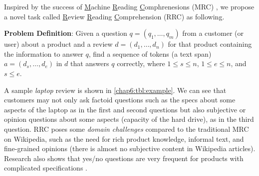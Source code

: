 Inspired by the success of \underline{M}achine \underline{R}eading \underline{C}omphrenesions (MRC) \cite{rajpurkar2016squad,rajpurkar2018know}, we propose a novel task called \underline{R}eview \underline{R}eading \underline{C}omprehension (RRC) as following.

\textbf{Problem Definition}: Given a question $q=(q_1, \dots, q_m)$ from a customer (or user) about a product and a review $d=(d_1, \dots, d_n)$ for that product containing the information to answer $q$, find a sequence of tokens (a text span) $a=(d_s, \dots, d_e)$ in $d$ that answers $q$ correctly, where $1 \le s \le n$, $1\le e \le n$, and $s\le e$.

\begin{table}
    \centering
    \caption{Review reading comprehension}
    \label{chap6:tbl:example}
\end{table}

A sample \emph{laptop} review is shown in \ref{chap6:tbl:example}. 
We can see that customers may not only ask factoid questions such as the specs about some aspects of the laptop as in the first and second questions but also subjective or opinion questions about some aspects (capacity of the hard drive), as in the third question.
RRC poses some \textit{domain challenges} compared to the traditional MRC on Wikipedia, such as the need for rich product knowledge, informal text, and fine-grained opinions (there is almost no subjective content in Wikipedia articles). Research also shows that yes/no questions are very frequent for products with complicated specifications \cite{mcauley2016addressing,Xu2018pro}.

